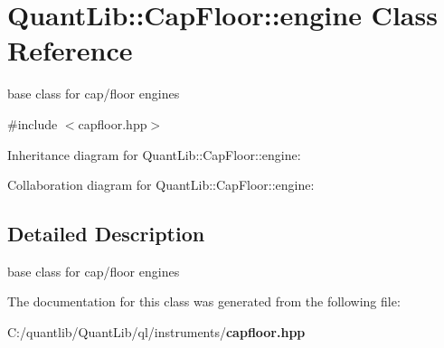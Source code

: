 \section{Quant\+Lib\+:\+:Cap\+Floor\+:\+:engine Class Reference}
\label{class_quant_lib_1_1_cap_floor_1_1engine}


base class for cap/floor engines  




{\ttfamily \#include $<$capfloor.\+hpp$>$}



Inheritance diagram for Quant\+Lib\+:\+:Cap\+Floor\+:\+:engine\+:


Collaboration diagram for Quant\+Lib\+:\+:Cap\+Floor\+:\+:engine\+:


\subsection{Detailed Description}
base class for cap/floor engines 

The documentation for this class was generated from the following file\+:\begin{DoxyCompactItemize}
\item 
C\+:/quantlib/\+Quant\+Lib/ql/instruments/{\bf capfloor.\+hpp}\end{DoxyCompactItemize}
